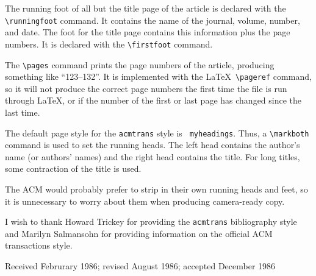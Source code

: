 The running foot of all but the title page of the article is declared
with the \linebreak
\verb|\runningfoot| command.  It contains the name of the
journal, volume, number, and date.  The foot for the title page
contains this information plus the page numbers.  It is declared
with the \verb|\firstfoot| command.

The \verb|\pages| command prints the page numbers of the article,
producing something like ``123--132''.  It is implemented with the
\LaTeX\ \verb|\pageref| command, so it will not produce the correct
page numbers the first time the file is run through \LaTeX, or if the
number of the first or last page has changed since the last time.

The default page style for the {\tt acmtrans} style is {\tt
myheadings}.  Thus, a \verb|\markboth| command is used to set the
running heads.  The left head contains the author's name (or authors'
names) and the right head contains the title.  For long titles,
some contraction of the title is used.

The ACM would probably prefer to strip in their own running heads and
feet, so it is unnecessary to worry about them when producing
camera-ready copy.

\begin{acks}
I wish to thank Howard Trickey for providing the {\tt acmtrans}
bibliography style and Marilyn Salmansohn for providing information
on the official ACM transactions style.
\end{acks}



\begin{received}
Received Februrary 1986; revised August 1986; accepted December 1986
\end{received}


